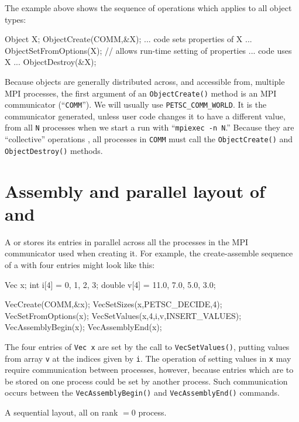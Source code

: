 The \pMat example above shows the sequence of operations which applies to all \PETSc object types:
\begin{code}
Object X;
ObjectCreate(COMM,&X);
... code sets properties of X ...
ObjectSetFromOptions(X);  // allows run-time setting of properties
... code uses X ...
ObjectDestroy(&X);
\end{code}
Because \PETSc objects are generally distributed across, and accessible from, multiple MPI processes, the first argument of an \texttt{ObjectCreate()} method is an MPI communicator (``\texttt{COMM}'').  We will usually use \texttt{PETSC\_COMM\_WORLD}.  It is the communicator generated, unless user code changes it to have a different value, from all \texttt{N} processes when we start a run with ``\verb|mpiexec -n N|.''  Because they are ``collective'' operations \citep{Groppetal1999}, all processes in \texttt{COMM} must call the \texttt{ObjectCreate()} and  \texttt{ObjectDestroy()} methods.


\section{Assembly and parallel layout of \pVecs and \pMats}

A \pVec or \pMat stores its entries in parallel across all the processes in the MPI communicator used when creating it.  For example, the create-assemble sequence of a \pVec with four entries might look like this:
\begin{code}
Vec    x;
int    i[4] = {0, 1, 2, 3};
double v[4] = {11.0, 7.0, 5.0, 3.0};

VecCreate(COMM,&x);
VecSetSizes(x,PETSC_DECIDE,4);
VecSetFromOptions(x);
VecSetValues(x,4,i,v,INSERT_VALUES);
VecAssemblyBegin(x);
VecAssemblyEnd(x);
\end{code}
The four entries of \texttt{Vec x} are set by the call to \texttt{VecSetValues()}, putting values from array \texttt{v} at the indices given by \texttt{i}.  The operation of setting values in \texttt{x} may require communication between processes, however, because entries which are to be stored on one process could be set by another process.  Such communication occurs between the \texttt{VecAssemblyBegin()} and \texttt{VecAssemblyEnd()} commands.

\begin{marginfigure}

\caption{A sequential \pVec layout, all on rank $=0$ process.}
\label{fig:seqveclayout}
\end{marginfigure}


